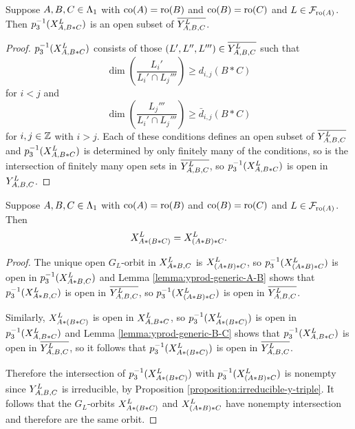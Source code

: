 \documentclass[a4paper, 11pt, twoside]{report}
\begin{document}
\begin{lemma}\label{lemma:yprod-generic-B-C}
Suppose $A,B,C\in\matrices$ with $\co{A}=\ro{B}$ and $\co{B}=\ro{C}$ and $L\in\flags_{\ro{A}}$. Then $p_3^{-1}(\xprod[L]{A,B\ast C})$ is an open subset of $\overline{\yprod[L]{A,B,C}}$.
\end{lemma}

\begin{proof}
$p_3^{-1}(\xprod[L]{A,B\ast C})$ consists of those $(L',L'',L''')\in\overline{\yprod[L]{A,B,C}}$ such that
\begin{equation*}
\dim\left(\frac{L_i'}{L_i'\cap L_j'''}\right)\geq d_{i,j}(B\ast C)
\end{equation*}
for $i<j$ and
\begin{equation*}
\dim\left(\frac{L_j'''}{L_i'\cap L_j'''}\right)\geq\bar{d}_{i,j}(B\ast C)
\end{equation*}
for $i,j\in\integers$ with $i>j$. Each of these conditions defines an open subset of $\overline{\yprod[L]{A,B,C}}$and $p_3^{-1}(\xprod[L]{A,B\ast C})$ is determined by only finitely many of the conditions, so is the intersection of finitely many open sets in $\overline{\yprod[L]{A,B,C}}$, so $p_3^{-1}(\xprod[L]{A,B\ast C})$ is open in $\yprod[L]{A,B,C}$.
\end{proof}

\begin{theorem}\label{theorem:associativity}
Suppose $A,B,C\in\matrices$ with $\co{A}=\ro{B}$ and $\co{B}=\ro{C}$ and $L\in\flags_{\ro{A}}$. Then
\begin{equation*}
\xprod[L]{A\ast (B\ast C)} = \xprod[L]{(A\ast B)\ast C}.
\end{equation*}
\end{theorem}

\begin{proof}
The unique open $G_L$-orbit in $\xprod[L]{A\ast B, C}$ is $\xprod[L]{(A\ast B)\ast C}$, so $p_3^{-1}(\xprod[L]{(A\ast B)\ast C})$ is open in $p_3^{-1}(\xprod[L]{A\ast B,C})$ and Lemma \ref{lemma:yprod-generic-A-B} shows that $p_3^{-1}(\xprod[L]{A\ast B,C})$ is open in $\overline{\yprod[L]{A,B,C}}$, so $p_3^{-1}(\xprod[L]{(A\ast B)\ast C})$ is open in $\overline{\yprod[L]{A,B,C}}$.

Similarly, $\xprod[L]{A\ast (B\ast C)}$ is open in $\xprod[L]{A,B\ast C}$, so $p_3^{-1}(\xprod[L]{A\ast (B\ast C)})$ is open in $p_3^{-1}(\xprod[L]{A,B\ast C})$ and Lemma \ref{lemma:yprod-generic-B-C} shows that $p_3^{-1}(\xprod[L]{A,B\ast C})$ is open in $\overline{\yprod[L]{A,B,C}}$, so it follows that $p_3^{-1}(\xprod[L]{A\ast (B\ast C)})$ is open in $\overline{\yprod[L]{A,B,C}}$.

Therefore the intersection of $p_3^{-1}(\xprod[L]{A\ast (B\ast C)})$ with $p_3^{-1}(\xprod[L]{(A\ast B)\ast C})$ is nonempty since $\yprod[L]{A,B,C}$ is irreducible, by Proposition \ref{proposition:irreducible-y-triple}. It follows that the $G_L$-orbits $\xprod[L]{A\ast (B\ast C)}$ and $\xprod[L]{(A\ast B)\ast C}$ have nonempty intersection and therefore are the same orbit.
\end{proof}
\end{document}
